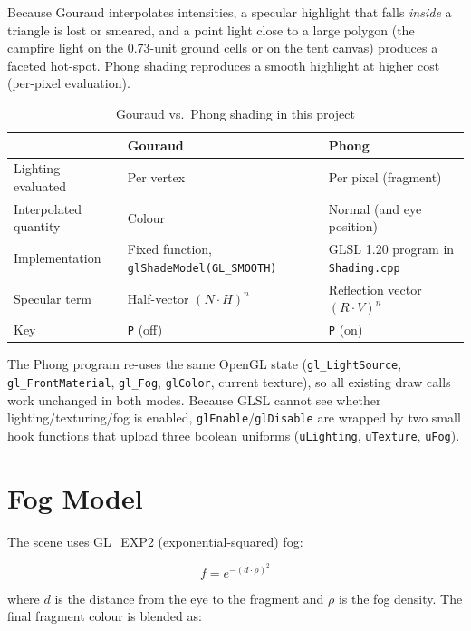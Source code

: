 \documentclass[12pt,a4paper]{report}
\newcommand{\tabfmt}{\footnotesize\singlespacing\renewcommand{\arraystretch}{1.1}}
\begin{document}
Because Gouraud interpolates intensities, a specular highlight that falls \emph{inside} a triangle is lost or smeared, and a point light close to a large polygon (the campfire light on the 0.73-unit ground cells or on the tent canvas) produces a faceted hot-spot. Phong shading reproduces a smooth highlight at higher cost (per-pixel evaluation).

\begin{table}[!htbp]
\centering\tabfmt
\caption{Gouraud vs.\ Phong shading in this project}
\label{tab:shading}
\begin{tabularx}{\textwidth}{|l|Y|Y|}
\hline
 & \textbf{Gouraud} & \textbf{Phong} \\
\hline
Lighting evaluated & Per vertex & Per pixel (fragment) \\
\hline
Interpolated quantity & Colour & Normal (and eye position) \\
\hline
Implementation & Fixed function, \texttt{glShadeModel(GL\_SMOOTH)} & GLSL 1.20 program in \texttt{Shading.cpp} \\
\hline
Specular term & Half-vector $(N\!\cdot\!H)^n$ & Reflection vector $(R\!\cdot\!V)^n$ \\
\hline
Key & \texttt{P} (off) & \texttt{P} (on) \\
\hline
\end{tabularx}
\end{table}

{\sloppy The Phong program re-uses the same OpenGL state (\texttt{gl\_LightSource}, \texttt{gl\_FrontMaterial}, \texttt{gl\_Fog}, \texttt{glColor}, current texture), so all existing draw calls work unchanged in both modes. Because GLSL cannot see whether lighting/texturing/fog is enabled, \texttt{glEnable}/\texttt{glDisable} are wrapped by two small hook functions that upload three boolean uniforms (\texttt{uLighting}, \texttt{uTexture}, \texttt{uFog}).\par}

\section{Fog Model}

The scene uses GL\_EXP2 (exponential-squared) fog:

\begin{equation}
f = e^{-(d \cdot \rho)^2}
\label{eq:fog}
\end{equation}

where $d$ is the distance from the eye to the fragment and $\rho$ is the fog density.
The final fragment colour is blended as:
\end{document}

